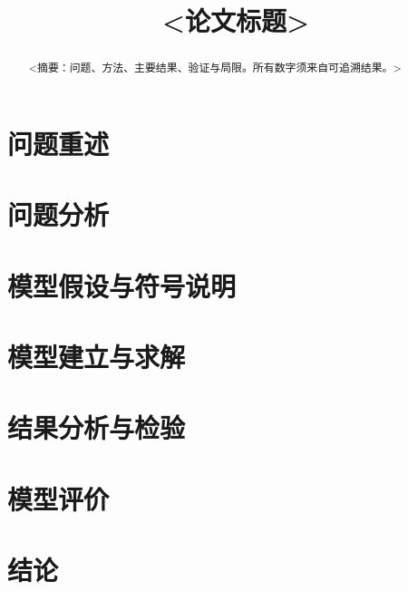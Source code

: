 \documentclass[12pt]{article}
\title{<论文标题>}
\author{} %
\date{}
\begin{document}
\maketitle

\begin{abstract}
<摘要：问题、方法、主要结果、验证与局限。所有数字须来自可追溯结果。>
\end{abstract}

\section{问题重述}
\section{问题分析}
\section{模型假设与符号说明}
\section{模型建立与求解}
\section{结果分析与检验}
\section{模型评价}
\section{结论}
\end{document}
